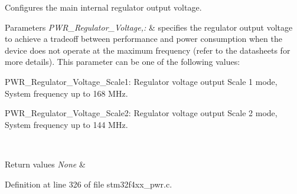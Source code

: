 Configures the main internal regulator output voltage. 


\begin{DoxyParams}{Parameters}
{\em P\-W\-R\-\_\-\-Regulator\-\_\-\-Voltage,\-:} & specifies the regulator output voltage to achieve a tradeoff between performance and power consumption when the device does not operate at the maximum frequency (refer to the datasheets for more details). This parameter can be one of the following values\-: \begin{DoxyItemize}
\item P\-W\-R\-\_\-\-Regulator\-\_\-\-Voltage\-\_\-\-Scale1\-: Regulator voltage output Scale 1 mode, System frequency up to 168 M\-Hz. \item P\-W\-R\-\_\-\-Regulator\-\_\-\-Voltage\-\_\-\-Scale2\-: Regulator voltage output Scale 2 mode, System frequency up to 144 M\-Hz. \end{DoxyItemize}
\\
\hline
\end{DoxyParams}

\begin{DoxyRetVals}{Return values}
{\em None} & \\
\hline
\end{DoxyRetVals}


Definition at line 326 of file stm32f4xx\-\_\-pwr.\-c.

